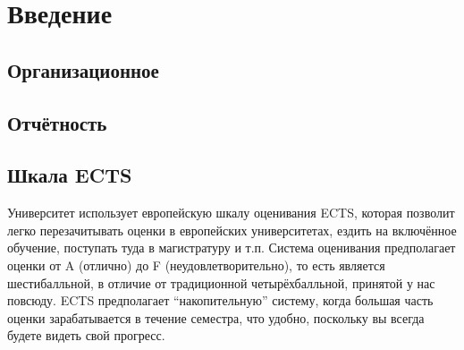 \documentclass{../../slide-style}
\author{Юрий Литвинов\\\small{yurii.litvinov@gmail.com}}
\begin{document}
\maketitle
\thispagestyle{empty}

\section{Введение}

\subsection{Организационное}


\subsection{Отчётность}


\subsection{Шкала ECTS}

Университет использует европейскую шкалу оценивания ECTS, которая позволит легко перезачитывать оценки в европейских университетах, ездить на включённое обучение, поступать туда в магистратуру и т.п. Система оценивания предполагает оценки от A (отлично) до F (неудовлетворительно), то есть является шестибалльной, в отличие от традиционной четырёхбалльной, принятой у нас повсюду. ECTS предполагает \enquote{накопительную} систему, когда большая часть оценки зарабатывается в течение семестра, что удобно, поскольку вы всегда будете видеть свой прогресс.
\end{document}
